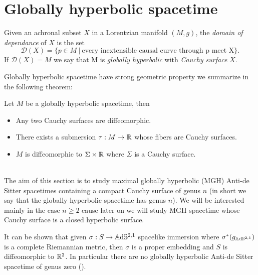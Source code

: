 \section{Globally hyperbolic spacetime}
\begin{definition}
    Given an achronal subset $X$ in a Lorentzian manifold $(M,g)$, the \textit{domain of dependance} of $X$ is the set
    \[
        \mathcal{D}(X)= \{ p \in M \ | \ \text{every inextensible causal curve through p meet X} \}.
    \]
    If $\mathcal{D}(X)=M$ we say that M is  \textit{globally hyperbolic} with \textit{Cauchy surface} $X$.
\end{definition}
Globally hyperbolic spacetime have strong geometric property we summarize in the following theorem:
\begin{theorem} \label{GH_structure}
    Let $M$ be a globally hyperbolic spacetime, then
    \begin{itemize}
        \item Any two Cauchy surfaces are diffeomorphic.
        \item There  exists a submersion $\tau : M \to \mathbb{R}$ whose fibers are Cauchy surfaces.
        \item $M$ is diffeomorphic to $\Sigma \times \mathbb{R}$ where $\Sigma$ is a Cauchy surface.
    \end{itemize}
\end{theorem}
\\
The aim of this section is to study maximal globally hyperbolic (MGH) Anti-de Sitter spacetimes containing a compact Cauchy surface of genus $n$ (in short we say that the globally hyperbolic spacetime has genus $n$). We will be interested mainly in the case $n\geq 2$ cause later on we will study MGH spacetime whose Cauchy surface is a closed hyperbolic surface.\\ 
\begin{observation}
    It can be shown that given $\sigma :S \to\mathbb{A}\mathrm{d}\mathbb{S}^{2,1}$ spacelike immersion where $\sigma^*(g_{\mathbb{A}\mathrm{d}\mathbb{S}^{2,1}})$ is a complete Riemannian metric, then $\sigma$ is a proper embedding and $S$ is diffeomorphic to $\mathbb{R}^2$.
    In particular there are no globally hyperbolic Anti-de Sitter spacetime of genus zero (\cite{bonsanteseppi}).
\end{observation}
